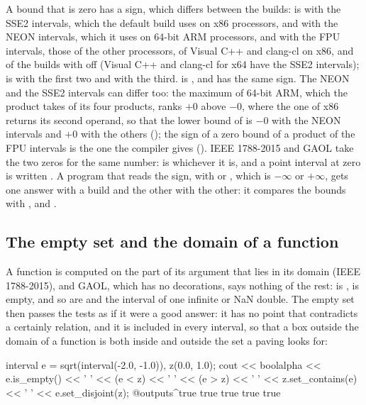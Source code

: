 \documentclass[12pt,a4paper,twoside,openright]{book}
\begin{document}
A bound that is zero has a sign, which differs between the builds:
 is  with the SSE2 intervals, which the
default build uses on x86 processors, and with the NEON intervals, which it
uses on 64-bit ARM processors, and  with the FPU intervals, those of
the other processors, of Visual C++ and clang-cl on x86, and of the builds
with  off (Visual C++ and clang-cl for x64 have the SSE2
intervals);\newinvfive{}  is  with the first
two and  with the third.  is , and has
the same sign.\newinvfive{} The NEON and the SSE2 intervals can differ too:
the maximum of 64-bit ARM, which the product takes of its four products, ranks
$+0$ above $-0$, where the one of x86 returns its second operand, so that the
lower bound of  is $-0$ with the NEON
intervals and $+0$ with the others (); the sign of a zero
bound of a product of the FPU intervals is the one the compiler gives
(). IEEE 1788-2015 and GAOL take the two zeros for
the same number:  is  whichever it is, and a
point interval at zero is written \code{[0]}. A program that reads the sign,
with  or , which is
$-\infty$ or $+\infty$, gets one answer with a build and the other with the
other: it compares the bounds with \code{==}, \code{<} and
\code{<=}.\newinvfive

\subsection{The empty set and the domain of a function}
%
%

A function is computed on the part of its argument that lies in its domain
(IEEE 1788-2015), and GAOL, which has no decorations, says nothing of the
rest:  is , 
is empty, and so are  and the interval of one infinite
or NaN double. The empty set then passes the tests as if it were a good
answer: it has no point that contradicts a certainly relation, and it is
included in every interval, so that a box outside the domain of a function is
both inside and outside the set a paving looks for:

\begin{example}
interval e = sqrt(interval(-2.0, -1.0)), z(0.0, 1.0);
cout << boolalpha << e.is_empty() << ' ' << (e < z) << ' '
     << (e > z) << ' ' << z.set_contains(e) << ' '
     << e.set_disjoint(z);
@outputs^true true true true true~
\end{example}
\end{document}
